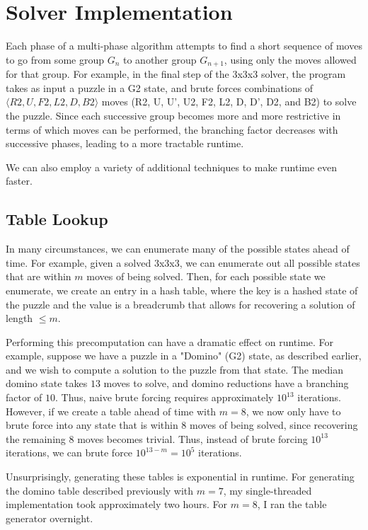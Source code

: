 \documentclass{article}
\begin{document}

\section{Solver Implementation}

Each phase of a multi-phase algorithm attempts to find a short sequence of moves to go from some group $G_n$ to another group $G_{n+1}$, using only the moves allowed for that group. For example, in the final step of the 3x3x3 solver, the program takes as input a puzzle in a G2 state, and brute forces combinations of $\langle R2, U, F2, L2, D, B2 \rangle$ moves (R2, U, U', U2, F2, L2, D, D', D2, and B2) to solve the puzzle. Since each successive group becomes more and more restrictive in terms of which moves can be performed, the branching factor decreases with successive phases, leading to a more tractable runtime.

We can also employ a variety of additional techniques to make runtime even faster.

\subsection{Table Lookup}

In many circumstances, we can enumerate many of the possible states ahead of time. For example, given a solved 3x3x3, we can enumerate out all possible states that are within $m$ moves of being solved. Then, for each possible state we enumerate, we create an entry in a hash table, where the key is a hashed state of the puzzle and the value is a breadcrumb that allows for recovering a solution of length $\leq m$.

Performing this precomputation can have a dramatic effect on runtime. For example, suppose we have a puzzle in a "Domino" (G2) state, as described earlier, and we wish to compute a solution to the puzzle from that state. The median domino state takes $13$ moves to solve, and domino reductions have a branching factor of $10$. Thus, naive brute forcing requires approximately $10^{13}$ iterations. However, if we create a table ahead of time with $m=8$, we now only have to brute force into any state that is within $8$ moves of being solved, since recovering the remaining $8$ moves becomes trivial. Thus, instead of brute forcing $10^{13}$ iterations, we can brute force $10^{13-m} = 10^5$ iterations.

Unsurprisingly, generating these tables is exponential in runtime. For generating the domino table described previously with $m=7$, my single-threaded implementation took approximately two hours. For $m=8$, I ran the table generator overnight.
\end{document}

